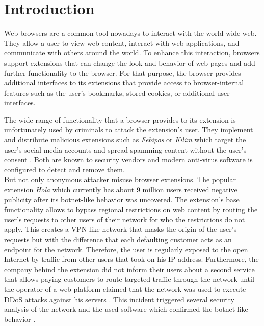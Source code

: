 
\chapter{Introduction}

	Web browsers are a common tool nowadays to interact with the world wide web. They allow a user to view web content, interact with web applications, and communicate with others around the world. To enhance this interaction, browsers support extensions that can change the look and behavior of web pages and add further functionality to the browser. For that purpose, the browser provides additional interfaces to its extensions that provide access to browser-internal features such as the user's bookmarks, stored cookies, or additional user interfaces.
	
	The wide range of functionality that a browser provides to its extension is unfortunately used by criminals to attack the extension's user. They implement and distribute malicious extensions such as \textit{Febipos} or \textit{Kilim} which target the user's social media accounts and spread spamming content without the user's consent \cite{febipos, kilim}. Both are known to security vendors and modern anti-virus software is configured to detect and remove them. \\
	But not only anonymous attacker misuse browser extensions. The popular extension \textit{Hola} which currently has about 9 million users received negative publicity after its botnet-like behavior was uncovered. The extension's base functionality allows to bypass regional restrictions on web content by routing the user's requests to other users of their network for who the restrictions do not apply. This creates a VPN-like network that masks the origin of the user's requests but with the difference that each defaulting customer acts as an endpoint for the network. Therefore, the user is regularly exposed to the open Internet by traffic from other users that took on his IP address. Furthermore, the company behind the extension did not inform their users about a second service that allows paying customers to route targeted traffic through the network until the operator of a web platform claimed that the network was used to execute DDoS attacks against his servers \cite{holaFaqRewrite, 8chanHola}. This incident triggered several security analysis of the network and the used software which confirmed the botnet-like behavior \cite{vectraHola}. \\
	
